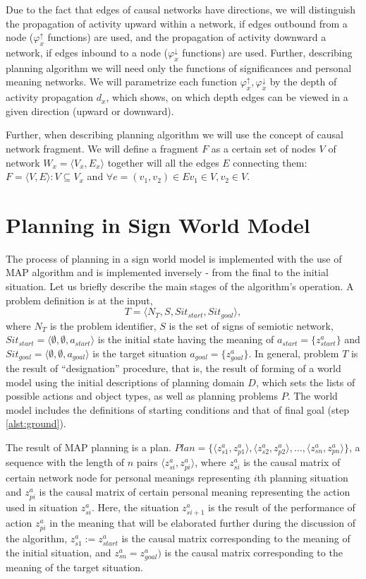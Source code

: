 \documentclass[review]{elsarticle}
\begin{document}
Due to the fact that edges of causal networks have directions, we will distinguish the propagation of activity upward within a network, if edges outbound from a node ($\varphi_x^\uparrow$ functions) are used, and the propagation of activity downward a network, if edges inbound to a node ($\varphi_x^\downarrow$ functions) are used. Further, describing planning algorithm we will need only the functions of significances and personal meaning networks. We will parametrize each function $\varphi_x^\uparrow,\varphi_x^\downarrow$ by the depth of activity propagation $d_x$, which shows, on which depth edges can be viewed in a given direction (upward or downward).

Further, when describing planning algorithm we will use the concept of causal network fragment. We will define a fragment $F$ as a certain set of nodes $V$ of network $W_x=\langle V_x,E_x\rangle$ together will all the edges $E$ connecting them: $F=\langle V,E\rangle: V\subseteq V_x$ and $\forall e=(v_1,v_2)\in E v_1\in V, v_2\in V$.


\section{Planning in Sign World Model}

The process of planning in a sign world model is implemented with the use of MAP algorithm and is implemented inversely - from the final to the initial situation. Let us briefly describe the main stages of the algorithm's operation. A problem definition is at the input, 
\[
	T = \langle N_T,S,Sit_{start}, Sit_{goal}\rangle,
\]
where $N_T$ is the problem identifier, $S$ is the set of signs of semiotic network, $Sit_{start}=\langle \emptyset, \emptyset, a_{start} \rangle$ is the initial state having the meaning of $a_{start}=\{z_{start}^a\}$ and $Sit_{goal}=\langle \emptyset, \emptyset, a_{goal} \rangle$ is the target situation $a_{goal}=\{z_{goal}^a\}$. In general, problem $T$ is the result of ``designation'' procedure, that is, the result of forming of a world model using the initial descriptions of planning domain $D$, which sets the lists of possible actions and object types, as well as planning problems $P$. The world model includes the definitions of starting conditions and that of final goal (step \ref{alst:ground}).

The result of MAP planning is a plan. $Plan=\{\langle z_{s1}^a,z_{p1}^a\rangle, \langle z_{s2}^a,z_{p2}^a\rangle,\dots, \langle z_{sn}^a,z_{pn}^a\rangle\}$, a sequence with the length of $n$ pairs $\langle z_{si}^a,z_{pi}^a\rangle$, where $z_{si}^a$ is the causal matrix of certain network node for personal meanings representing $i$th planning situation and $z_{pi}^a$ is the causal matrix of certain personal meaning representing the action used in situation $z_{si}^a$. Here, the situation $z_{si+1}^a$ is the result of the performance of action $z_{pi}^a$ in the meaning that will be elaborated further during the discussion of the algorithm, $z_{s1}^a := z_{start}^a$ is the causal matrix corresponding to the meaning of the initial situation, and $z_{sn}^a=z_{goal}^a)$ is the causal matrix corresponding to the meaning of the target situation.
\end{document}
